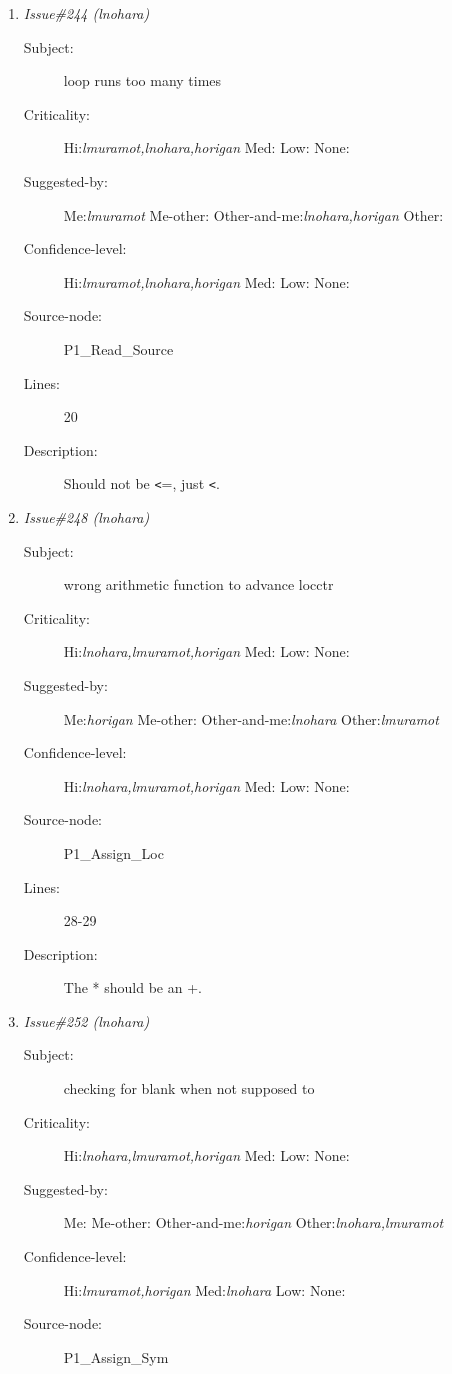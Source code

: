 \begin{enumerate}
\begin{description}
\item [Lines:] 57-58

\item [Description:] The operation code is a 6 char field.  The 13
will only get 5 of the characters.
\end{description}
\item {\it Issue\#244 (lnohara)}
\begin{description}
\item [Subject:] loop runs too many times
\item [Criticality:] Hi:{\it lmuramot,lnohara,horigan} Med:{\it } Low:{\it } None:{\it }
\item [Suggested-by:] Me:{\it lmuramot} Me-other:{\it } Other-and-me:{\it lnohara,horigan} Other:{\it }
\item [Confidence-level:] Hi:{\it lmuramot,lnohara,horigan} Med:{\it } Low:{\it } None:{\it }
\item [Source-node:] P1\_Read\_Source

\item [Lines:] 20

\item [Description:] Should not be {\tt <}=, just {\tt <}.
\end{description}
\item {\it Issue\#248 (lnohara)}
\begin{description}
\item [Subject:] wrong arithmetic function to advance locctr
\item [Criticality:] Hi:{\it lnohara,lmuramot,horigan} Med:{\it } Low:{\it } None:{\it }
\item [Suggested-by:] Me:{\it horigan} Me-other:{\it } Other-and-me:{\it lnohara} Other:{\it lmuramot}
\item [Confidence-level:] Hi:{\it lnohara,lmuramot,horigan} Med:{\it } Low:{\it } None:{\it }
\item [Source-node:] P1\_Assign\_Loc

\item [Lines:] 28-29

\item [Description:] The * should be an +.
\end{description}
\item {\it Issue\#252 (lnohara)}
\begin{description}
\item [Subject:] checking for blank when not supposed to
\item [Criticality:] Hi:{\it lnohara,lmuramot,horigan} Med:{\it } Low:{\it } None:{\it }
\item [Suggested-by:] Me:{\it } Me-other:{\it } Other-and-me:{\it horigan} Other:{\it lnohara,lmuramot}
\item [Confidence-level:] Hi:{\it lmuramot,horigan} Med:{\it lnohara} Low:{\it } None:{\it }
\item [Source-node:] P1\_Assign\_Sym


\end{description}
\end{enumerate}
